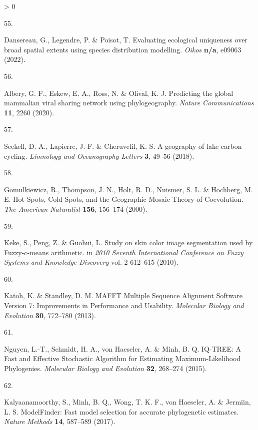 \documentclass[11pt]{article}
\newlength{\cslhangindent}
\newlength{\csllabelwidth}
\newenvironment{CSLReferences}[3] %
 {%
  \setlength{\parindent}{0pt}
  \ifodd #1 \everypar{\setlength{\hangindent}{\cslhangindent}}\ignorespaces\fi
  \ifnum #2 > 0
  \setlength{\parskip}{#2\baselineskip}
  \fi
 }%
 {}
\newcommand{\CSLLeftMargin}[1]{\parbox[t]{\maxof{\widthof{#1}}{\csllabelwidth}}{#1}}
\newcommand{\CSLRightInline}[1]{\parbox[t]{\linewidth}{#1}}
\begin{document}
\begin{CSLReferences}{0}{0}
\leavevmode\hypertarget{ref-Dansereau2022EvaEco}{}%
\CSLLeftMargin{55. }
\CSLRightInline{Dansereau, G., Legendre, P. \& Poisot, T. Evaluating
ecological uniqueness over broad spatial extents using species
distribution modelling. \emph{Oikos} \textbf{n/a}, e09063 (2022).}

\leavevmode\hypertarget{ref-Albery2020PreGlo}{}%
\CSLLeftMargin{56. }
\CSLRightInline{Albery, G. F., Eskew, E. A., Ross, N. \& Olival, K. J.
Predicting the global mammalian viral sharing network using
phylogeography. \emph{Nature Communications} \textbf{11}, 2260 (2020).}

\leavevmode\hypertarget{ref-Seekell2018GeoLak}{}%
\CSLLeftMargin{57. }
\CSLRightInline{Seekell, D. A., Lapierre, J.-F. \& Cheruvelil, K. S. A
geography of lake carbon cycling. \emph{Limnology and Oceanography
Letters} \textbf{3}, 49--56 (2018).}

\leavevmode\hypertarget{ref-Gomulkiewicz2000HotSpo}{}%
\CSLLeftMargin{58. }
\CSLRightInline{Gomulkiewicz, R., Thompson, J. N., Holt, R. D., Nuismer,
S. L. \& Hochberg, M. E. Hot Spots, Cold Spots, and the Geographic
Mosaic Theory of Coevolution. \emph{The American Naturalist}
\textbf{156}, 156--174 (2000).}

\leavevmode\hypertarget{ref-Keke2010StuSki}{}%
\CSLLeftMargin{59. }
\CSLRightInline{Keke, S., Peng, Z. \& Guohui, L. Study on skin color
image segmentation used by Fuzzy-c-means arithmetic. in \emph{2010
Seventh International Conference on Fuzzy Systems and Knowledge
Discovery} vol. 2 612--615 (2010).}

\leavevmode\hypertarget{ref-Katoh2013MafMul}{}%
\CSLLeftMargin{60. }
\CSLRightInline{Katoh, K. \& Standley, D. M. MAFFT Multiple Sequence
Alignment Software Version 7: Improvements in Performance and Usability.
\emph{Molecular Biology and Evolution} \textbf{30}, 772--780 (2013).}

\leavevmode\hypertarget{ref-Nguyen2015IqtFas}{}%
\CSLLeftMargin{61. }
\CSLRightInline{Nguyen, L.-T., Schmidt, H. A., von Haeseler, A. \& Minh,
B. Q. IQ-TREE: A Fast and Effective Stochastic Algorithm for Estimating
Maximum-Likelihood Phylogenies. \emph{Molecular Biology and Evolution}
\textbf{32}, 268--274 (2015).}

\leavevmode\hypertarget{ref-Kalyaanamoorthy2017ModFas}{}%
\CSLLeftMargin{62. }
\CSLRightInline{Kalyaanamoorthy, S., Minh, B. Q., Wong, T. K. F., von
Haeseler, A. \& Jermiin, L. S. ModelFinder: Fast model selection for
accurate phylogenetic estimates. \emph{Nature Methods} \textbf{14},
587--589 (2017).}


\end{CSLReferences}
\end{document}
